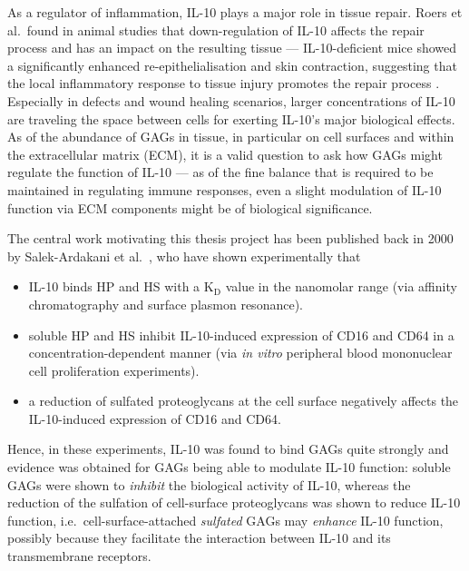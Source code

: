 As a regulator of inflammation, IL-10 plays a major role in tissue repair. Roers
et al.\ found in animal studies that down-regulation of IL-10 affects the repair
process and has an impact on the resulting tissue --- IL-10-deficient mice
showed a significantly enhanced re-epithelialisation and skin contraction,
suggesting that the local inflammatory response to tissue injury promotes the
repair process \cite{roers_il10mice_woundhealing_2007}. Especially in defects
and wound healing scenarios, larger concentrations of IL-10 are traveling the
space between cells for exerting IL-10's major biological effects. As of the
abundance of GAGs in tissue, in particular on cell surfaces and within the
extracellular matrix (ECM), it is a valid question to ask how GAGs might
regulate the function of IL-10 --- as of the fine balance that is required to be
maintained in regulating immune responses, even a slight modulation of IL-10
function via ECM components might be of biological significance.

The central work motivating this thesis project has been published back in 2000
by Salek-Ardakani et al.\ \cite{salek_ardakani_2000}, who have shown
experimentally that

\begin{itemize}
\item IL-10 binds HP and HS with a $\mathrm{K}_\mathrm{D}$
value in the nanomolar range (via affinity chromatography and surface plasmon
resonance).
\item soluble HP and HS inhibit IL-10-induced expression of CD16 and CD64 in a
concentration-dependent manner (via \textit{in vitro} peripheral blood
mononuclear cell proliferation experiments).
\item a reduction of sulfated proteoglycans at the cell surface negatively
affects the IL-10-induced expression of CD16 and CD64.
\end{itemize}

Hence, in these experiments, IL-10 was found to bind GAGs quite strongly and
evidence was obtained for GAGs being able to modulate IL-10 function: soluble
GAGs were shown to \textit{inhibit} the biological activity of IL-10, whereas
the reduction of the sulfation of cell-surface proteoglycans was shown to reduce
IL-10 function, i.e.\ cell-surface-attached \textit{sulfated} GAGs may
\textit{enhance} IL-10 function, possibly because they facilitate the
interaction between IL-10 and its transmembrane receptors.

